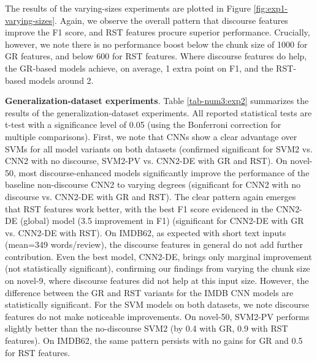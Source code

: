 The results of the varying-sizes experiments are plotted in Figure \ref{fig:exp1-varying-sizes}.
Again, we observe the overall pattern that discourse features improve the F1 score, and RST features procure superior performance. 
Crucially, however, we note there is no performance boost below the chunk size of 1000 for GR features, and below 600 for RST features.
Where discourse features do help, the GR-based models achieve, on average, 1 extra point on F1, and the RST-based models around 2. 

\medskip

\noindent
\textbf{Generalization-dataset experiments}.
Table \ref{tab-num3:exp2} summarizes the results of the generalization-dataset experiments. All reported statistical tests are t-test with a significance level of 0.05 (using the Bonferroni correction for multiple comparisons). First, we note that CNNs show a clear advantage over SVMs for all model variants on both datasets (confirmed significant for SVM2 vs. CNN2 with no discourse, SVM2-PV vs. CNN2-DE with GR and RST).
On novel-50, most discourse-enhanced models significantly improve the performance of the baseline non-discourse CNN2 to varying degrees (significant for CNN2 with no discourse vs. CNN2-DE with GR and RST). 
The clear pattern again emerges that RST features work better, with the best F1 score evidenced in the CNN2-DE (global) model (3.5 improvement in F1) (significant for CNN2-DE with GR vs. CNN2-DE with RST). 
On IMDB62, as expected with short text inputs (mean=349 words/review), the discourse features in general do not add further contribution. Even the best model, CNN2-DE, brings only marginal improvement (not statistically significant), confirming our findings from varying the chunk size on novel-9, where discourse features did not help at this input size. However, the difference between the GR and RST variants for the IMDB CNN models are statistically significant.
For the SVM models on both datasets, we note discourse features do not make noticeable improvements. On novel-50, SVM2-PV performs slightly better than the no-discourse SVM2 (by 0.4 with GR, 0.9 with RST features). On IMDB62, the same pattern persists with no gains for GR and 0.5 for RST features. 

